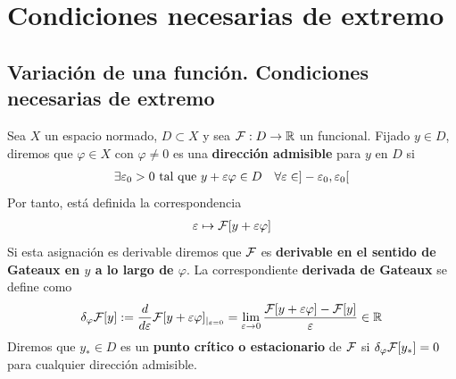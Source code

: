 \chapter{Condiciones necesarias de extremo}

\section{Variación de una función. Condiciones necesarias de extremo}
\begin{definicion}
    Sea $X$ un espacio normado, $D\subset X$ y sea $\mathcal{F}:D \to \mathbb{R}$ un funcional. Fijado $y\in D$, diremos que $\varphi\in X$ con $\varphi\neq 0$ es una \textbf{dirección admisible} para $y$ en $D$ si 
    \begin{gather*}
        \exists\veps_0>0 \text{ tal que } y+\veps \varphi \in D\ \ \ \forall\veps \in ]-\veps_0, \veps_0[
    \end{gather*}
    Por tanto, está definida la correspondencia 
    \begin{gather*}
        \varepsilon \mapsto \mathcal{F}[y+\varepsilon\varphi]
    \end{gather*}
    Si esta asignación es derivable diremos que $\mathcal{F}$ es \textbf{derivable en el sentido de Gateaux en $y$ a lo largo de $\varphi$}. La correspondiente \textbf{derivada de Gateaux} se define como
    \begin{gather*}
        \delta_\varphi \mathcal{F}[y] := \frac{d}{d \varepsilon} \mathcal{F}[y+\varepsilon\varphi]_{|_{\varepsilon=0}} = \lim_{\varepsilon\to 0} \frac{\mathcal{F}[y+\varepsilon\varphi] - \mathcal{F}[y]}{\varepsilon} \in \mathbb{R}
    \end{gather*}
    Diremos que $y_*\in D$ es un \textbf{punto crítico o estacionario} de $\mathcal{F}$ si $\delta_\varphi \mathcal{F}[y_*] = 0$ para cualquier dirección admisible.
\end{definicion}

